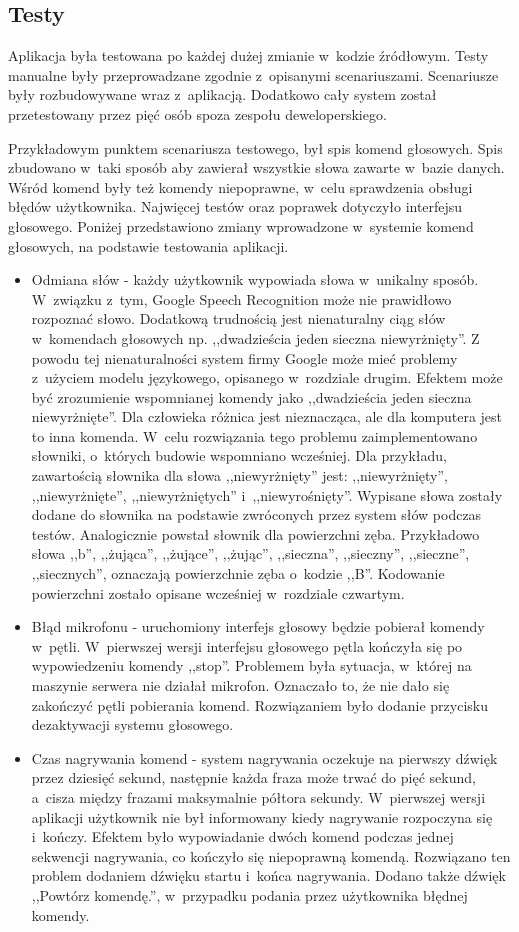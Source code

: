 \subsection{Testy}
Aplikacja była testowana po każdej dużej zmianie w~kodzie źródłowym. Testy manualne były przeprowadzane zgodnie z~opisanymi scenariuszami. Scenariusze były rozbudowywane wraz z~aplikacją. Dodatkowo cały system został przetestowany przez pięć osób spoza zespołu deweloperskiego.

Przykładowym punktem scenariusza testowego, był spis komend głosowych. Spis zbudowano w~taki sposób aby zawierał wszystkie słowa zawarte w~bazie danych. Wśród komend były też komendy niepoprawne, w~celu sprawdzenia obsługi błędów użytkownika. Najwięcej testów oraz poprawek dotyczyło interfejsu głosowego. Poniżej przedstawiono zmiany wprowadzone w~systemie komend głosowych, na podstawie testowania aplikacji.
\begin{itemize}
    \item Odmiana słów - każdy użytkownik wypowiada słowa w~unikalny sposób. W~związku z~tym, Google Speech Recognition może nie prawidłowo rozpoznać słowo. Dodatkową trudnością jest nienaturalny ciąg słów w~komendach głosowych np. ,,dwadzieścia jeden sieczna niewyrżnięty''. Z powodu tej nienaturalności system firmy Google może mieć problemy z~użyciem modelu językowego, opisanego w~rozdziale drugim. Efektem może być zrozumienie wspomnianej komendy jako ,,dwadzieścia jeden sieczna niewyrżnięte''. Dla człowieka różnica jest nieznacząca, ale dla komputera jest to inna komenda. W~celu rozwiązania tego problemu zaimplementowano słowniki, o~których budowie wspomniano wcześniej. Dla przykładu, zawartością słownika dla słowa ,,niewyrżnięty'' jest:  ,,niewyrżnięty'', ,,niewyrżnięte'', ,,niewyrżniętych'' i~,,niewyrośnięty''. Wypisane słowa zostały dodane do słownika na podstawie zwróconych przez system słów podczas testów. Analogicznie powstał słownik dla powierzchni zęba. Przykładowo słowa ,,b'', ,,żująca'', ,,żujące'', ,,żując'', ,,sieczna'', ,,sieczny'', ,,sieczne'', ,,siecznych'', oznaczają powierzchnie zęba o~kodzie ,,B''. Kodowanie powierzchni zostało opisane wcześniej w~rozdziale czwartym.
    \item Błąd mikrofonu - uruchomiony interfejs głosowy będzie pobierał komendy w~pętli. W~pierwszej wersji interfejsu głosowego pętla kończyła się po wypowiedzeniu komendy ,,stop''. Problemem była sytuacja, w~której na maszynie serwera nie działał mikrofon. Oznaczało to, że nie dało się zakończyć pętli pobierania komend. Rozwiązaniem było dodanie przycisku dezaktywacji systemu głosowego.
    \item Czas nagrywania komend - system nagrywania oczekuje na pierwszy dźwięk przez dziesięć sekund, następnie każda fraza może trwać do pięć sekund, a~cisza między frazami maksymalnie półtora sekundy. W~pierwszej wersji aplikacji użytkownik nie był informowany kiedy nagrywanie rozpoczyna się i~kończy. Efektem było wypowiadanie dwóch komend podczas jednej sekwencji nagrywania, co kończyło się niepoprawną komendą. Rozwiązano ten problem dodaniem dźwięku startu i~końca nagrywania. Dodano także dźwięk ,,Powtórz komendę.'', w~przypadku podania przez użytkownika błędnej komendy. 
\end{itemize}

